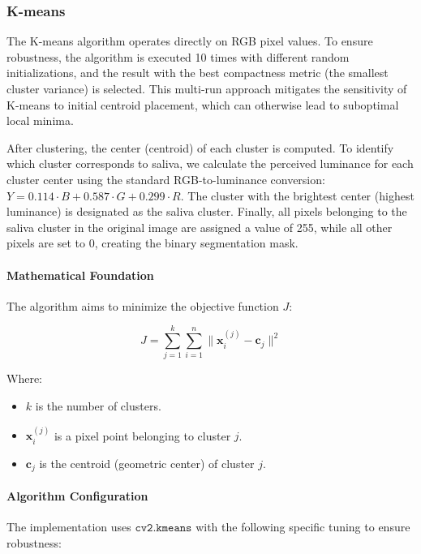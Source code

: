 \subsubsection{K-means}

The K-means algorithm operates directly on RGB pixel values. To ensure robustness, the algorithm is executed 10 times with different random initializations, and the result with the best compactness metric (the smallest cluster variance) is selected. This multi-run approach mitigates the sensitivity of K-means to initial centroid placement, which can otherwise lead to suboptimal local minima.

After clustering, the center (centroid) of each cluster is computed. To identify which cluster corresponds to saliva, we calculate the perceived luminance for each cluster center using the standard RGB-to-luminance conversion: \(Y = 0.114 \cdot B + 0.587 \cdot G + 0.299 \cdot R\). The cluster with the brightest center (highest luminance) is designated as the saliva cluster. Finally, all pixels belonging to the saliva cluster in the original image are assigned a value of 255, while all other pixels are set to 0, creating the binary segmentation mask.

\paragraph{Mathematical Foundation}

The algorithm aims to minimize the objective function \(J\):

\begin{equation}
  J = \sum_{j=1}^{k} \sum_{i=1}^{n} \| \mathbf{x}_i^{(j)} - \mathbf{c}_j \|^2
\end{equation}

Where:
\begin{itemize}
  \item \(k\) is the number of clusters.
  \item \(\mathbf{x}_i^{(j)}\) is a pixel point belonging to cluster \(j\).
  \item \(\mathbf{c}_j\) is the centroid (geometric center) of cluster \(j\).
\end{itemize}

\paragraph{Algorithm Configuration}

The implementation uses \(\texttt{cv2.kmeans}\) with the following specific tuning to ensure robustness:

